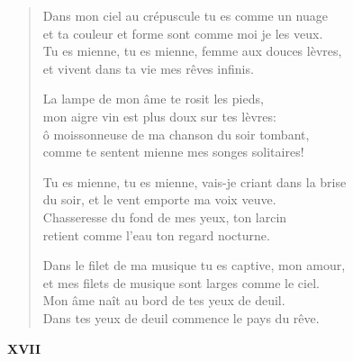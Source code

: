 \documentclass[11pt,a4paper]{book}
\begin{document}
\begin{verse}
  Dans mon ciel au crépuscule tu es comme un nuage \\
  et ta couleur et forme sont comme moi je les veux. \\
  Tu es mienne, tu es mienne, femme aux douces lèvres, \\
  et vivent dans ta vie mes rêves infinis.

  La lampe de mon âme te rosit les pieds, \\
  mon aigre vin est plus doux sur tes lèvres: \\
  ô moissonneuse de ma chanson du soir tombant, \\
  comme te sentent mienne mes songes solitaires!

  Tu es mienne, tu es mienne, vais-je criant dans la brise \\
  du soir, et le vent emporte ma voix veuve. \\
  Chasseresse du fond de mes yeux, ton larcin \\
  retient comme l'eau ton regard nocturne.

  Dans le filet de ma musique tu es captive, mon amour, \\
  et mes filets de musique sont larges comme le ciel. \\
  Mon âme naît au bord de tes yeux de deuil. \\
  Dans tes yeux de deuil commence le pays du rêve.
\end{verse}

\newpage


\begin{center} \textbf{XVII} \end{center}

\bigskip
\end{document}
